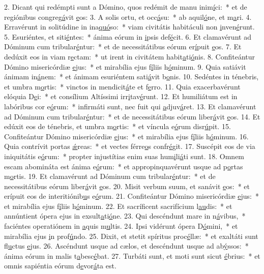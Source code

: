 2. Dicant qui redémpti sunt a Dómino, quos redémit de manu inim\uline{í}ci:~* et de regiónibus congreg\uline{á}vit \uline{e}os:
3. A solis ortu, et occ\uline{á}su:~* ab aquil\uline{ó}ne, et m\uline{a}ri.
4. Erravérunt in solitúdine in ina\uline{quó}so:~* viam civitátis habitáculi non \uline{i}nven\uline{é}runt.
5. Esuriéntes, et siti\uline{é}ntes:~* ánima eórum in \uline{i}psis def\uline{é}cit.
6. Et clamavérunt ad Dóminum cum tribular\uline{é}ntur:~* et de necessitátibus eórum er\uline{í}puit \uline{e}os.
7. Et dedúxit eos in viam r\uline{e}ctam:~* ut irent in civitátem habit\uline{a}ti\uline{ó}nis.
8. Confiteántur Dómino misericórdiæ \uline{e}jus:~* et mirabília ejus f\uline{í}liis h\uline{ó}minum.
9. Quia satiávit ánimam in\uline{á}nem:~* et ánimam esuriéntem sati\uline{á}vit b\uline{o}nis.
10. Sedéntes in ténebris, et umbra m\uline{o}rtis:~* vinctos in mendicit\uline{á}te et f\uline{e}rro.
11. Quia exacerbavérunt elóquia D\uline{e}i:~* et consílium Altíssimi irr\uline{i}tav\uline{é}runt.
12. Et humiliátum est in labóribus cor e\uline{ó}rum:~* infirmáti sunt, nec fuit qui \uline{a}djuv\uline{á}ret.
13. Et clamavérunt ad Dóminum cum tribular\uline{é}ntur:~* et de necessitátibus eórum liber\uline{á}vit \uline{e}os.
14. Et edúxit eos de ténebris, et umbra m\uline{o}rtis:~* et víncula e\uline{ó}rum disr\uline{ú}pit.
15. Confiteántur Dómino misericórdiæ \uline{e}jus:~* et mirabília ejus f\uline{í}liis h\uline{ó}minum.
16. Quia contrívit portas \uline{ǽ}reas:~* et vectes férre\uline{o}s confr\uline{é}git.
17. Suscépit eos de via iniquitátis e\uline{ó}rum:~* propter injustítias enim suas hum\uline{i}li\uline{á}ti sunt.
18. Omnem escam abomináta est ánima e\uline{ó}rum:~* et appropinquavérunt usque ad p\uline{o}rtas m\uline{o}rtis.
19. Et clamavérunt ad Dóminum cum tribular\uline{é}ntur:~* et de necessitátibus eórum liber\uline{á}vit \uline{e}os.
20. Misit verbum suum, et sanávit \uline{e}os:~* et erípuit eos de interitiónib\uline{u}s e\uline{ó}rum.
21. Confiteántur Dómino misericórdiæ \uline{e}jus:~* et mirabília ejus f\uline{í}liis h\uline{ó}minum.
22. Et sacríficent sacrifícium l\uline{au}dis:~* et annúntient ópera ejus in exsult\uline{a}ti\uline{ó}ne.
23. Qui descéndunt mare in n\uline{á}vibus,~* faciéntes operatiónem in \uline{a}quis m\uline{u}ltis.
24. Ipsi vidérunt ópera D\uline{ó}mini,~* et mirabília ejus \uline{i}n prof\uline{ú}ndo.
25. Dixit, et stetit spíritus proc\uline{é}llæ:~* et exaltáti sunt fl\uline{u}ctus \uline{e}jus.
26. Ascéndunt usque ad cælos, et descéndunt usque ad ab\uline{ý}ssos:~* ánima eórum in malis t\uline{a}besc\uline{é}bat.
27. Turbáti sunt, et moti sunt sicut \uline{é}brius:~* et omnis sapiéntia eórum d\uline{e}vor\uline{á}ta est.
